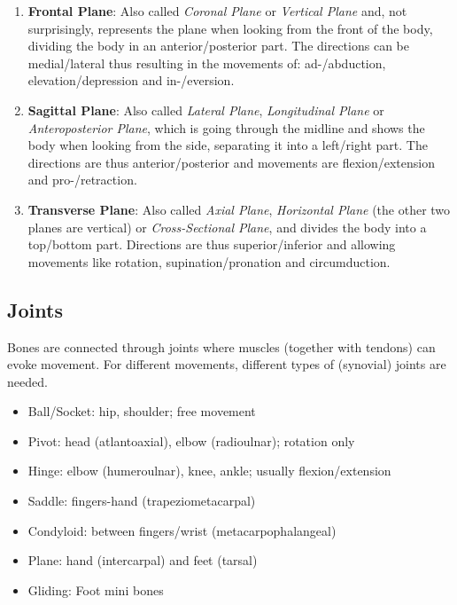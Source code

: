 \begin{enumerate}
    \setlength\itemsep{0em}
    \item \textbf{Frontal Plane}: Also called \textit{Coronal Plane} or \textit{Vertical Plane} and, not surprisingly, represents the plane when looking from the front of the body, dividing the body in an anterior/posterior part.
    The directions can be medial/lateral thus resulting in the movements of: ad-/abduction, elevation/depression and in-/eversion.
    \item \textbf{Sagittal Plane}: Also called \textit{Lateral Plane}, \textit{Longitudinal Plane} or \textit{Anteroposterior Plane}, which is going through the midline and shows the body when looking from the side, separating it into a left/right part.
    The directions are thus anterior/posterior and movements are flexion/extension and pro-/retraction.
    \item \textbf{Transverse Plane}: Also called \textit{Axial Plane}, \textit{Horizontal Plane} (the other two planes are vertical) or \textit{Cross-Sectional Plane}, and divides the body into a top/bottom part.
    Directions are thus superior/inferior and allowing movements like rotation, supination/pronation and circumduction.
\end{enumerate}

\subsection{Joints}\label{subsec:joints}

Bones are connected through joints where muscles (together with tendons) can evoke movement.
For different movements, different types of (synovial) joints are needed.

\begin{itemize}
    \setlength\itemsep{0em}
    \item Ball/Socket: hip, shoulder; free movement
    \item Pivot: head (atlantoaxial), elbow (radioulnar); rotation only
    \item Hinge: elbow (humeroulnar), knee, ankle; usually flexion/extension
    \item Saddle: fingers-hand (trapeziometacarpal)
    \item Condyloid: between fingers/wrist (metacarpophalangeal)
    \item Plane: hand (intercarpal) and feet (tarsal)
    \item Gliding: Foot mini bones
\end{itemize}
